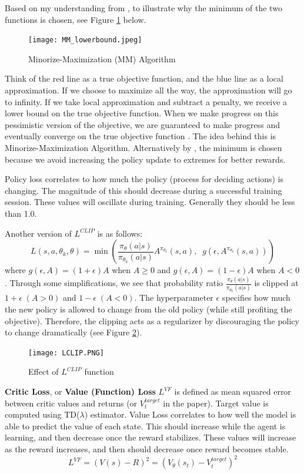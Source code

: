 \documentclass[lang=en,mode=normal,device=normal,color=blue,12pt]{elegantnote}
\DeclareMathOperator*{\1}{\mathbbm{1}}
\begin{document}
Based on my understanding from \cite{ppocs294}, to illustrate why the minimum of the two functions is chosen, see Figure \ref{fig:mm_algo} below.
\begin{figure}[!ht]
  \centering
  \texttt{[image: MM\_lowerbound.jpeg]}
  \caption{Minorize-Maximization (MM) Algorithm}
  \label{fig:mm_algo}
\end{figure}
Think of the red line as a true objective function, and the blue line as a local approximation.
If we choose to maximize all the way, the approximation will go to infinity.
If we take local approximation and subtract a penalty, we receive a lower bound on the true objective function.
When we make progress on this pessimistic version of the objective, we are guaranteed to make progress and eventually converge on the true objective function . The idea behind this is Minorize-Maximization Algorithm.
Alternatively by \cite{weng2018PG}, the minimum is chosen because we avoid increasing the policy update to extremes for better rewards.

Policy loss correlates to how much the policy (process for deciding actions) is changing.
The magnitude of this should decrease during a successful training session.
These values will oscillate during training. Generally they should be less than 1.0.


Another version of $L^{CLIP}$ is as follows:
$$ L(s,a,\theta_k,\theta) = \min\left(
\frac{\pi_{\theta}(a|s)}{\pi_{\theta_k}(a|s)}  A^{\pi_{\theta_k}}(s,a), \;\;
g(\epsilon, A^{\pi_{\theta_k}}(s,a))
\right) $$
where $g(\epsilon,A) = (1+\epsilon)A$ when $A \geq 0$ and $g(\epsilon,A) = (1-\epsilon)A$ when $A < 0$. Through some simplifications, we see that probability ratio $\frac{\pi_{\theta}(a|s)}{\pi_{\theta_k}(a|s)}$ is clipped at $1+\epsilon\;(A>0)$ and $1-\epsilon\;(A<0)$. The hyperparameter $\epsilon$ specifies how much the new policy is allowed to change from the old policy (while still profiting the objective). Therefore, the clipping acts as a regularizer by discouraging the policy to change dramatically (see Figure \ref{fig:lclip}).

\begin{figure}[!ht]
  \centering
  \texttt{[image: LCLIP.PNG]}
  \caption{Effect of $L^{CLIP}$ function \cite{ppolclip}}
  \label{fig:lclip}
\end{figure}

\textbf{Critic Loss}, or \textbf{Value (Function) Loss} $L^{VF}$ is defined as mean squared error between critic values and returns (or $V_t^{target}$ in the paper).
Target value is computed using TD($\lambda$) estimator.
Value Loss correlates to how well the model is able to predict the value of each state.
This should increase while the agent is learning, and then decrease once the reward stabilizes.
These values will increase as the reward increases, and then should decrease once reward becomes stable.
\[
L^{VF} = (V(s) - R)^2 = (V_\theta(s_t) - V_t^{target})^2
\]
\end{document}
